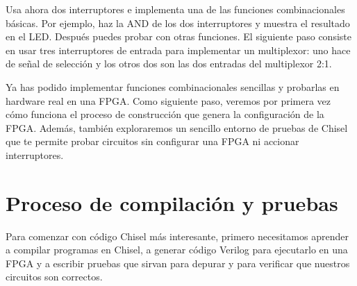\documentclass[%
    10pt,
    headinclude, footinclude=false,
    openright, %
    notitlepage,
    cleardoublepage=empty,
    headsepline,
    numbers=noenddot,
    bibliography=totoc, index=totoc,
    ]{scrbook}
\newcommand{\code}[1]{{\lstinline[basicstyle=\small\ttfamily]{#1}}}
\newcommand{\myref}[2]{\href{#1}{#2}}
\renewcommand{\myref}[2]{{#2}{\footnote{\url{#1}}}}
\begin{document}
Usa ahora dos interruptores e implementa una de las funciones combinacionales básicas.
Por ejemplo, haz la AND de los dos interruptores y muestra el resultado en el LED. Después puedes probar con otras funciones.
El siguiente paso consiste en usar tres interruptores de entrada para implementar un multiplexor: uno hace
de señal de selección y los otros dos son las dos entradas del multiplexor 2:1.


Ya has podido implementar funciones combinacionales sencillas y probarlas
en hardware real en una FPGA. Como siguiente paso, veremos por primera vez cómo funciona el proceso
de construcción que genera la configuración de la FPGA. Además, también
exploraremos un sencillo entorno de pruebas de Chisel que te permite probar circuitos
sin configurar una FPGA ni accionar interruptores.

\chapter{Proceso de compilación y pruebas}
\label{chap:build:test}


Para comenzar con código Chisel más interesante, primero necesitamos aprender a compilar
programas en Chisel, a generar código Verilog para ejecutarlo en una FPGA
y a escribir pruebas que sirvan para depurar y para verificar que nuestros circuitos son correctos.

\end{document}

